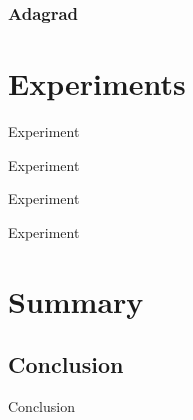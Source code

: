\documentclass{beamer}
\begin{document}
    \begin{frame}
    \end{frame}



    \begin{frame}
      \begin{center}
      \end{center}
    \end{frame}


    \begin{frame}
      \frametitle{Adagrad}
    \end{frame}


    
    \section{Experiments} %
    \begin{frame}{Experiment}
    \end{frame}
    

    \nocite{*}
    \begin{frame}{Experiment}
    \end{frame}

    \begin{frame}{Experiment}
    \end{frame}

    \begin{frame}{Experiment}
    \end{frame}
    

    \section{Summary} %
    \subsection{Conclusion}
    \begin{frame}{Conclusion}

    \end{frame}
\end{document}
